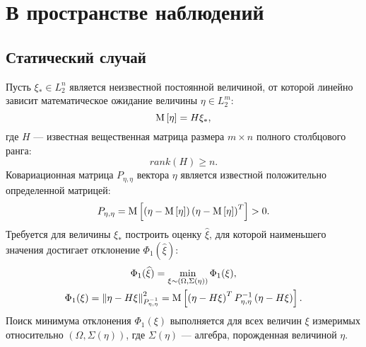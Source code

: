 \chapter{В пространстве наблюдений}

\section{Статический случай} \label{section:filtering:in_observations:static}

Пусть $\xi_* \in L_2^n$ является неизвестной постоянной величиной, от которой линейно зависит математическое ожидание величины $\eta \in L_2^m$:
$$
	\mathrm{M} \left [ \eta \right ] = H \xi_* ,
$$
где $H$ --- известная вещественная матрица размера $m \times n$ полного столбцового ранга:
$$
	rank(H) \geq n .
$$
Ковариационная матрица $P_{\eta, \eta}$ вектора $\eta$ является известной положительно определенной матрицей:
$$
	P_{\eta, \eta} = \mathrm{M} \left [ \left ( \eta - \mathrm{M} \left [ \eta \right ] \right ) \left ( \eta - \mathrm{M} \left [ \eta \right ] \right )^T \right ] > 0 .
$$
Требуется для величины $\xi_*$ построить оценку $\widehat{\xi}$, для которой наименьшего значения достигает отклонение $\Phi_1(\widehat{\xi})$:
\begin{gather*}
	\Phi_1(\widehat{\xi}) = \min_{\xi \sim (\Omega, \Sigma(\eta))} \Phi_1(\xi) , \\
	\Phi_1(\xi) = \left \| \eta - H \xi \right \|_{P_{\eta, \eta}^{-1}}^2 = \mathrm{M} \left [ \left ( \eta - H \xi \right )^T P_{\eta, \eta}^{-1} \left ( \eta - H \xi \right ) \right ] .
\end{gather*}
Поиск минимума отклонения $\Phi_1(\xi)$ выполняется для всех величин $\xi$ измеримых относительно $\left ( \Omega, \Sigma(\eta) \right )$, где
$\Sigma(\eta)$ --- алгебра, порожденная величиной $\eta$.

